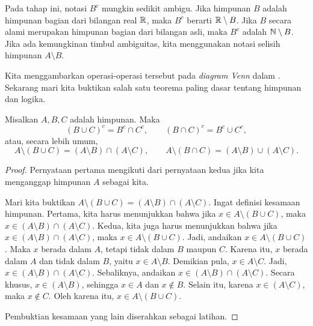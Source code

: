 Pada tahap ini, notasi $B^c$ mungkin sedikit ambigu.  Jika
himpunan $B$ adalah himpunan bagian dari bilangan real ${\mathbb{R}}$, maka $B^c$
berarti ${\mathbb{R}} \setminus B$.  Jika $B$ secara alami merupakan himpunan bagian dari
bilangan asli, maka $B^c$ adalah ${\mathbb{N}} \setminus B$.
Jika ada kemungkinan timbul ambiguitas, kita menggunakan notasi selisih himpunan
$A \setminus B$.

\begin{myfigureht}
\caption{Diagram Venn untuk operasi himpunan; hasil operasinya
diarsir.\label{figsetop}}
\end{myfigureht}
Kita menggambarkan operasi-operasi tersebut pada
\emph{diagram Venn} dalam .
Sekarang mari kita buktikan salah satu teorema paling dasar tentang himpunan
dan logika.

\begin{thm}[DeMorgan]
Misalkan $A, B, C$ adalah himpunan.  Maka
\begin{equation*}
{(B \cup C)}^c = B^c \cap C^c , \qquad
{(B \cap C)}^c = B^c \cup C^c ,
\end{equation*}
atau, secara lebih umum,
\begin{equation*}
A \setminus (B \cup C) = (A \setminus B) \cap (A \setminus C) , 
\qquad
A \setminus (B \cap C) = (A \setminus B) \cup (A \setminus C) .
\end{equation*}
\end{thm}

\begin{proof}
Pernyataan pertama mengikuti dari pernyataan kedua jika kita
menganggap himpunan $A$ sebagai  kita.

Mari kita buktikan
$A \setminus (B \cup C) = (A \setminus B) \cap (A \setminus C)$.
Ingat definisi kesamaan himpunan.  Pertama, kita harus menunjukkan bahwa
jika $x \in A \setminus (B \cup C)$, maka
$x \in (A \setminus B) \cap (A \setminus C)$.  Kedua, kita juga harus
menunjukkan bahwa jika $x \in (A \setminus B) \cap (A \setminus C)$, maka
$x \in A \setminus (B \cup C)$.
Jadi, andaikan $x \in A \setminus (B \cup C)$.  Maka $x$ berada dalam
$A$, tetapi tidak dalam $B$ maupun $C$.  Karena itu, $x$ berada dalam $A$ dan
tidak dalam $B$, yaitu $x \in A \setminus B$.  Demikian pula,
$x \in A \setminus C$.  Jadi,
$x \in (A \setminus B) \cap (A \setminus C)$.
Sebaliknya, andaikan
$x \in (A \setminus B) \cap (A \setminus C)$.  Secara khusus,
$x \in (A \setminus B)$, sehingga
$x \in A$ dan $x \notin B$.  Selain itu, karena
$x \in (A \setminus C)$, maka $x \notin C$.
Oleh karena itu, $x \in A \setminus (B \cup C)$.

Pembuktian kesamaan yang lain diserahkan sebagai latihan.
\end{proof}

